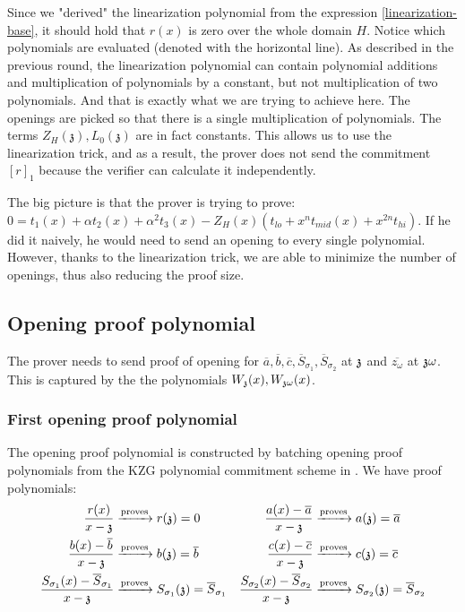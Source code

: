 Since we "derived" the linearization polynomial from the expression \ref{linearization-base}, it should hold that $r(x)$ is zero over the whole domain $H$. Notice which polynomials are evaluated (denoted with the horizontal line). As described in the previous round, the linearization polynomial can contain polynomial additions and multiplication of polynomials by a constant, but not multiplication of two polynomials. And that is exactly what we are trying to achieve here. The openings are picked so that there is a single multiplication of polynomials. The terms $Z_H(\mathfrak{z}), L_0(\mathfrak{z})$ are in fact constants. This allows us to use the linearization trick, and as a result, the prover does not send the commitment $[r]_1$ because the verifier can calculate it independently. 

The big picture is that the prover is trying to prove: $0 = t_1(x) + \alpha t_2(x) + \alpha^2 t_3(x) - Z_H(x)(t_{lo} + x^{n}t_{mid}(x) + x^{2n}t_{hi})$. If he did it naively, he would need to send an opening to every single polynomial. However, thanks to the linearization trick, we are able to minimize the number of openings, thus also reducing the proof size.


\subsection{Opening proof polynomial}
The prover needs to send proof of opening for $\overline{a}, \overline{b}, \overline{c}, \overline{S}_{\sigma_1}, \overline{S}_{\sigma_2}$ at $\mathfrak{z}$ and $\overline{z_\omega}$ at $\mathfrak{z}\omega$. This is captured by the the polynomials $W_{\mathfrak{z}}(x), W_{\mathfrak{z}\omega}(x)$.


\subsubsection{First opening proof polynomial}
The opening proof polynomial is constructed by batching opening proof polynomials from the KZG polynomial commitment scheme in . We have proof polynomials:
\begin{align*}
  \frac{r(x)}{x-\mathfrak{z}} &\xrightarrow{\text{proves}} r(\mathfrak{z}) = 0  & \frac{a(x) - \overline{a}}{x-\mathfrak{z}} &\xrightarrow{\text{proves}} a(\mathfrak{z}) = \overline{a} \\
  \frac{b(x) - \overline{b}}{x-\mathfrak{z}} &\xrightarrow{\text{proves}} b(\mathfrak{z}) = \overline{b}  & \frac{c(x) - \overline{c}}{x-\mathfrak{z}} &\xrightarrow{\text{proves}} c(\mathfrak{z}) = \overline{c} \\
  \frac{S_{\sigma_1}(x) - \overline{S}_{\sigma_1}}{x-\mathfrak{z}} &\xrightarrow{\text{proves}} S_{\sigma_1}(\mathfrak{z}) = \overline{S}_{\sigma_1}  & \frac{S_{\sigma_2}(x) - \overline{S}_{\sigma_2}}{x-\mathfrak{z}} &\xrightarrow{\text{proves}} S_{\sigma_2}(\mathfrak{z}) = \overline{S}_{\sigma_2} \\
\end{align*}

